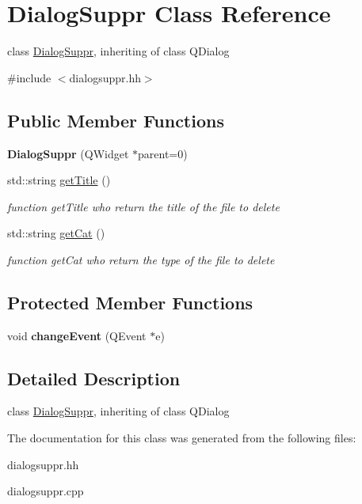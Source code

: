 \hypertarget{classDialogSuppr}{
\section{DialogSuppr Class Reference}
\label{classDialogSuppr}
}


class \hyperlink{classDialogSuppr}{DialogSuppr}, inheriting of class QDialog  




{\ttfamily \#include $<$dialogsuppr.hh$>$}

\subsection*{Public Member Functions}
\begin{DoxyCompactItemize}
\item 
\hypertarget{classDialogSuppr_affbe6fa75215bb1bf4f35b89de101e2d}{
{\bfseries DialogSuppr} (QWidget $\ast$parent=0)}
\label{classDialogSuppr_affbe6fa75215bb1bf4f35b89de101e2d}

\item 
\hypertarget{classDialogSuppr_a56dc789c9e5f42dd71e9ff37ad497c3e}{
std::string \hyperlink{classDialogSuppr_a56dc789c9e5f42dd71e9ff37ad497c3e}{getTitle} ()}
\label{classDialogSuppr_a56dc789c9e5f42dd71e9ff37ad497c3e}

\begin{DoxyCompactList}\small\item\em function getTitle who return the title of the file to delete \item\end{DoxyCompactList}\item 
\hypertarget{classDialogSuppr_a46ed4e9bf7cefe40670c4df3b4cb637a}{
std::string \hyperlink{classDialogSuppr_a46ed4e9bf7cefe40670c4df3b4cb637a}{getCat} ()}
\label{classDialogSuppr_a46ed4e9bf7cefe40670c4df3b4cb637a}

\begin{DoxyCompactList}\small\item\em function getCat who return the type of the file to delete \item\end{DoxyCompactList}\end{DoxyCompactItemize}
\subsection*{Protected Member Functions}
\begin{DoxyCompactItemize}
\item 
\hypertarget{classDialogSuppr_a098e0e2b472f81bb740ccda02cf8cecd}{
void {\bfseries changeEvent} (QEvent $\ast$e)}
\label{classDialogSuppr_a098e0e2b472f81bb740ccda02cf8cecd}

\end{DoxyCompactItemize}


\subsection{Detailed Description}
class \hyperlink{classDialogSuppr}{DialogSuppr}, inheriting of class QDialog 

The documentation for this class was generated from the following files:\begin{DoxyCompactItemize}
\item 
dialogsuppr.hh\item 
dialogsuppr.cpp\end{DoxyCompactItemize}
